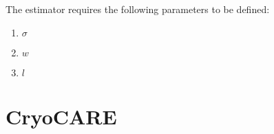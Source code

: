 \documentclass{article}
\begin{document}
The estimator requires the following parameters to be defined:
\begin{enumerate}
\item $\sigma$
\item $w$
\item $l$
\end{enumerate}
  
\section{CryoCARE}

\section{}



\end{document}
